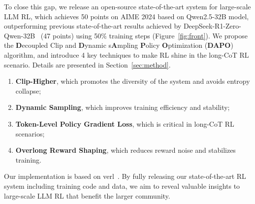 To close this gap, we release an open-source state-of-the-art system for large-scale LLM RL, which achieves 50 points on AIME 2024 based on Qwen2.5-32B model, outperforming previous state-of-the-art results achieved by DeepSeek-R1-Zero-Qwen-32B~\cite{guo2025deepseek} (47 points) using 50\% training steps (Figure~\ref{fig:front}). We propose the \textbf{D}ecoupled Clip and \textbf{D}ynamic s\textbf{A}mpling \textbf{P}olicy \textbf{O}ptimization (\textbf{DAPO}) algorithm, and introduce 4 key techniques to make RL shine in the long-CoT RL scenario. Details are presented in Section~\ref{sec:method}.
\begin{enumerate}
    \item \textbf{Clip-Higher}, which promotes the diversity of the system and avoids entropy collapse;
    \item \textbf{Dynamic Sampling}, which improves training efficiency and stability;
    \item \textbf{Token-Level Policy Gradient Loss}, which is critical in long-CoT RL scenarios;
    \item \textbf{Overlong Reward Shaping}, which reduces reward noise and stabilizes training.
\end{enumerate}
Our implementation is based on verl~\cite{sheng2024hybridflow}. By fully releasing our state-of-the-art RL system including training code and data, we aim to reveal valuable insights to large-scale LLM RL that benefit the larger community.
